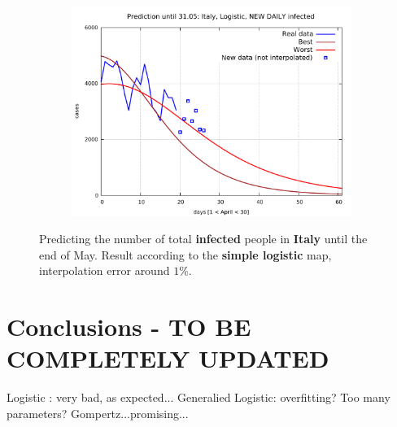\documentclass[8pt]{article}
\begin{document}
\begin{figure}[h!]
\begin{subfigure}[b]{0.48\linewidth}
  \includegraphics[width=\linewidth]{../it_l_t/peak/peak_prediction.pdf}
  \end{subfigure}
  \caption{Predicting the number of total \textbf{infected}
	people in \textbf{Italy} until the
	end of May. Result according to the \textbf{simple logistic} map,
	interpolation error around $1\%$.}
\end{figure}

\section{Conclusions - TO BE COMPLETELY UPDATED}
Logistic : very bad, as expected...
Generalied Logistic: overfitting? Too many parameters?
Gompertz...promising...
\end{document}
